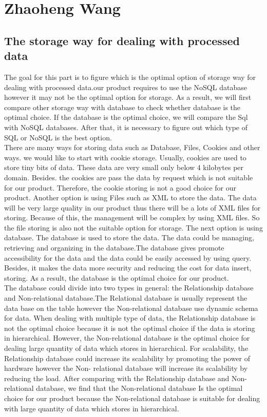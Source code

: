 \documentclass[10pt,draftclsnofoot,onecolumn,journal,compsoc]{IEEEtran}
\begin{document}
    
    
    \section{Zhaoheng Wang}
        \subsection{The storage way for dealing with processed data}
        The goal for this part is to figure which is the optimal option of storage way for dealing with  processed data.our product requires to use the NoSQL database however it may not be the optimal option for storage. As a result, we will first compare other storage way with database to check whether database is the optimal choice. If the database is the optimal choice, we will compare the Sql with NoSQL databases. After that, it is necessary to figure out which type of SQL or NoSQL is the best option.\\
    
        \noindent There are many ways for storing data such as Database, Files, Cookies and other ways. we would like to start with cookie storage. Usually, cookies are used to store tiny bits of data. These data are very small only below 4 kilobytes per domain\cite{W1}. Besides. the cookies are pass the data by request which is not suitable for our product. Therefore, the cookie storing is not a good choice for our product. Another option is using Files such as XML to store the data. The data will be very large quality in our product thus there will be a lots of XML files for storing. Because of this, the management will be complex by using XML files. So the file storing is also not the suitable option for storage. The next option is using database. The database is used to store the data. The data could be managing, retrieving and organizing in the database\cite{W2}.The database gives promote accessibility for the data and the data could be easily accessed by using query. Besides, it makes the data more security and reducing the cost for data insert, storing\cite{W3}. As a result, the database is the optimal choice for our product.\\
        
        \noindent The database could divide into two types in general: the Relationship database and Non-relational database.The Relational database is usually represent the data base on the table however the Non-relational database use dynamic schema for data. When dealing with multiple type of data, the Relationship database is not the optimal choice because it is not the optimal choice if the data is storing in hierarchical. However, the Non-relational database is the optimal choice for  dealing large quantity of data which stores in hierarchical. For scalability, the Relationship database could increase its scalability by promoting the power of hardware however the Non- relational database will increase its scalability by reducing the load. After comparing with the Relationship database and Non-relational database, we find that the Non-relational database Is the optimal choice for our product because the Non-relational database is suitable for dealing with large quantity of data which stores in hierarchical\cite{W4}.
        
\end{document}
